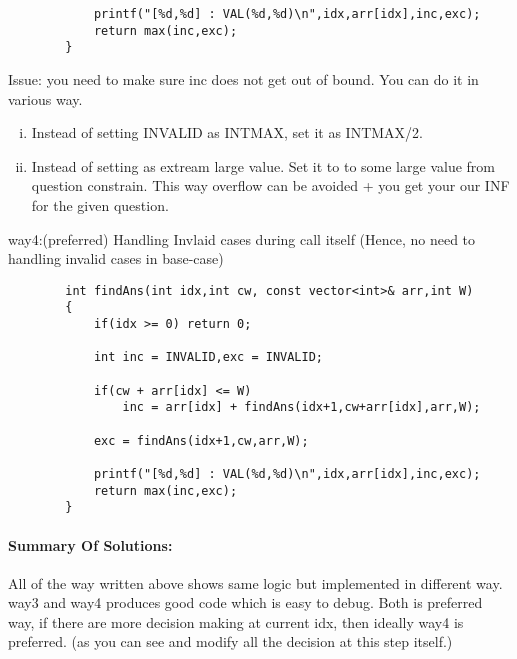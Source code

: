 \begin{solution}
\begin{verbatim}
            printf("[%d,%d] : VAL(%d,%d)\n",idx,arr[idx],inc,exc);
            return max(inc,exc);
        }
    \end{verbatim}

Issue: you need to make sure inc does not get out of bound. You can do it in various way.


\begin{enumerate}[(i)]
    \item Instead of setting INVALID as INTMAX, set it as INTMAX/2.
    \item Instead of setting as extream large value. Set it to to some large value from question constrain. This way overflow can be avoided + you get your our INF for the given question.
\end{enumerate} 


way4:(preferred) Handling Invlaid cases during call itself (Hence, no need to handling invalid cases in base-case)

    \begin{verbatim}
        int findAns(int idx,int cw, const vector<int>& arr,int W)
        {
            if(idx >= 0) return 0;

            int inc = INVALID,exc = INVALID;

            if(cw + arr[idx] <= W)
                inc = arr[idx] + findAns(idx+1,cw+arr[idx],arr,W);
            
            exc = findAns(idx+1,cw,arr,W);

            printf("[%d,%d] : VAL(%d,%d)\n",idx,arr[idx],inc,exc);
            return max(inc,exc);
        }
    \end{verbatim}

    \paragraph{Summary Of Solutions:} All of the way written above shows same logic but implemented in different way.
    way3 and way4 produces good code which is easy to debug.
    Both is preferred way, if there are more decision making at current idx, then ideally way4 is preferred. (as you can see and modify all the decision at this step itself.)

\end{solution}